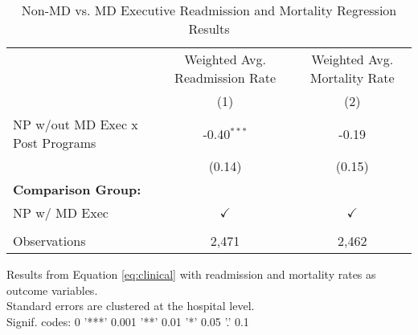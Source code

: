 \begin{table}[ht!]
   \caption{\label{tab:MD_noMD_readmort_fullsample} Non-MD vs. MD Executive Readmission and Mortality Regression Results}
   \bigskip
   \centering
   \begin{tabular}{lcc}
      \toprule
                                       & Weighted Avg. Readmission Rate & Weighted Avg. Mortality Rate\\  
                                       & (1)                            & (2)\\  
      \midrule 
      NP w/out MD Exec x Post Programs & -0.40$^{***}$                  & -0.19\\   
                                       & (0.14)                         & (0.15)\\   
      \textbf{Comparison Group:}       &                                & \\  
      NP w/ MD Exec                    & $\checkmark$                   & $\checkmark$\\   
       \\
      Observations                     & 2,471                          & 2,462\\  
      \bottomrule
   \end{tabular}
   
   \par \raggedright 
   Results from Equation \ref{eq:clinical} with readmission and mortality rates as outcome variables.\\
   Standard errors are clustered at the hospital level.\\
   Signif. codes: 0 '***' 0.001 '**' 0.01 '*' 0.05 '.' 0.1
\end{table}
